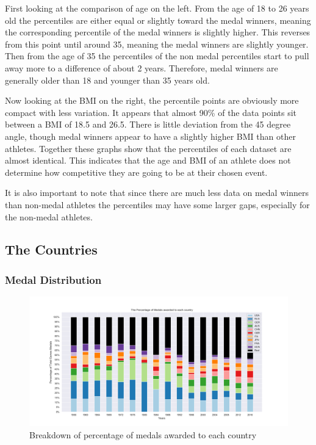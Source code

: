 \documentclass[a4 paper, 12pt]{article}
\begin{document}
        First looking at the comparison of age on the left. From the age of 18 to 26 years old the percentiles are either equal or slightly toward the medal winners, meaning the corresponding percentile of the medal winners is slightly higher. This reverses from this point until around 35, meaning the medal winners are slightly younger. Then from the age of 35 the percentiles of the non medal percentiles start to pull away more to a difference of about 2 years. Therefore, medal winners are generally older than 18 and younger than 35 years old. 

        Now looking at the BMI on the right, the percentile points are obviously more compact with less variation. It appears that almost 90\% of the data points sit between a BMI of 18.5 and 26.5. There is little deviation from the 45 degree angle, though medal winners appear to have a slightly higher BMI than other athletes. Together these graphs show that the percentiles of each dataset are almost identical. This indicates that the age and BMI of an athlete does not determine how competitive they are going to be at their chosen event.

        It is also important to note that since there are much less data on medal winners than non-medal athletes the percentiles may have some larger gaps, especially for the non-medal athletes.
    
    \subsection{The Countries}


        \subsubsection{Medal Distribution}


        \begin{figure} [H]
            \centering
            \includegraphics[width=\textwidth, frame]
                {./images/graph/countries_medals_stacked.png}      
                \caption{Breakdown of percentage of medals awarded to each country} 
        \end{figure}
\end{document}
